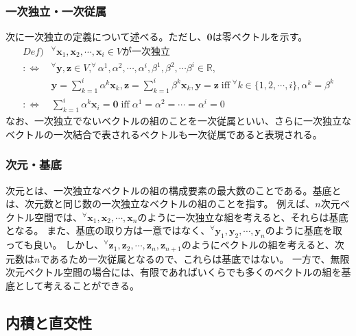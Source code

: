 \documentclass[10pt]{ujarticle}
\begin{document}
\subsubsection{一次独立・一次従属}
次に一次独立の定義について述べる。ただし、$\mathbf{0}$は零ベクトルを示す。
$$
\begin{aligned}
  Def)& ^\forall\mathbf{x}_1,\mathbf{x}_2,\cdots,\mathbf{x}_i\in V\text{が一次独立}\\
  :\Leftrightarrow & ^\forall\mathbf{y},\mathbf{z}\in V, ^\forall\alpha^1,\alpha^2,\cdots,\alpha^i,\beta^1,\beta^2,\cdots\beta^i\in\mathbb{R},\\
  & \mathbf{y}=\sum_{k=1}^{i}\alpha^k\mathbf{x}_k,\mathbf{z}=\sum_{k=1}^{i}\beta^k\mathbf{x}_k,\mathbf{y}=\mathbf{z}\;\text{iff}\; ^\forall k\in\{1,2,\cdots,i\},\alpha^k=\beta^k\\
  :\Leftrightarrow & \sum_{k=1}^{i}\alpha^k\mathbf{x}_i=\mathbf{0}\;\text{iff}\;\alpha^1=\alpha^2=\cdots=\alpha^i=0
\end{aligned}
$$
なお、一次独立でないベクトルの組のことを一次従属といい、さらに一次独立なベクトルの一次結合で表されるベクトルも一次従属であると表現される。

\subsubsection{次元・基底}
次元とは、一次独立なベクトルの組の構成要素の最大数のことである。基底とは、次元数と同じ数の一次独立なベクトルの組のことを指す。
例えば、$n$次元ベクトル空間では、$^\forall\mathbf{x}_1,\mathbf{x}_2,\cdots,\mathbf{x}_n$のように一次独立な組を考えると、それらは基底となる。
また、基底の取り方は一意ではなく、$^\forall\mathbf{y}_1,\mathbf{y}_2,\cdots,\mathbf{y}_n$のように基底を取っても良い。
しかし、$^\forall\mathbf{z}_1,\mathbf{z}_2,\cdots,\mathbf{z}_n,\mathbf{z}_{n+1}$のようにベクトルの組を考えると、次元数は$n$であるため一次従属となるので、これらは基底ではない。
一方で、無限次元ベクトル空間の場合には、有限であればいくらでも多くのベクトルの組を基底として考えることができる。

\hypertarget{innerprod}{\subsection{内積と直交性}}
\end{document}
